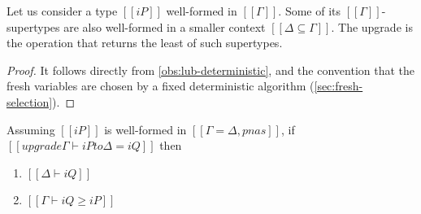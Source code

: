 Let us consider a type $[[iP]]$ well-formed in $[[Γ]]$.
Some of its $[[Γ]]$-supertypes are also well-formed in a smaller context $[[{Δ} ⊆ Γ]]$.
The upgrade is the operation that returns the least of such supertypes.

\obsUpgradeDeterminism*
\begin{proof}
    It follows directly from \cref{obs:lub-deterministic},
    and the convention that the fresh variables are chosen by a fixed deterministic algorithm
    (\cref{sec:fresh-selection}).
\end{proof}

\lemmaUpgradeSoundness*
\begin{lemma}\label{lemma:upgrade-soundness}
    Assuming $[[iP]]$ is well-formed in $[[Γ = Δ, pnas]]$,
    if $[[upgrade Γ ⊢ iP to Δ = iQ]]$
    then
    \begin{enumerate}
        \item $[[Δ ⊢ iQ]]$
        \item $[[Γ ⊢ iQ ≥ iP]]$
    \end{enumerate}
\end{lemma}
